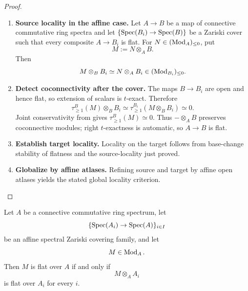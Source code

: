 \begin{proof}
\leavevmode
\begin{enumerate}[label=\textup{(\arabic*)}]
    \item \textbf{Source locality in the affine case.}
    Let \(A\to B\) be a map of connective commutative ring spectra and let
    \(\{\operatorname{Spec}(B_i)\to\operatorname{Spec}(B)\}\) be a Zariski cover such that every
    composite \(A\to B_i\) is flat. For \(N\in(\operatorname{Mod}_{A})_{\leq0}\), put
    \[
        M:=N\otimes_AB.
    \]
    Then
    \[
        M\otimes_BB_i
        \simeq
        N\otimes_AB_i
        \in
        (\operatorname{Mod}_{B_i})_{\leq0}.
    \]

    \item \textbf{Detect coconnectivity after the cover.}
    The maps \(B\to B_i\) are open and hence flat, so extension of scalars is
    \(t\)-exact. Therefore
    \[
        \tau_{\geq1}^{B}(M)\otimes_BB_i
        \simeq
        \tau_{\geq1}^{B_i}(M\otimes_BB_i)
        \simeq0.
    \]
    Joint conservativity from
     gives
    \(\tau_{\geq1}^{B}(M)\simeq0\). Thus \(-\otimes_AB\) preserves
    coconnective modules; right \(t\)-exactness is automatic, so \(A\to B\)
    is flat.

    \item \textbf{Establish target locality.}
    Locality on the target follows from base-change stability of flatness and
    the source-locality just proved.

    \item \textbf{Globalize by affine atlases.}
    Refining source and target by affine open
    atlases yields the stated global locality criterion.
\end{enumerate}
\end{proof}

\begin{proposition}
\label{prop:flat-module-zariski-local}
Let \(A\) be a connective commutative ring spectrum, let
\[
    \{\operatorname{Spec}(A_i)\to\operatorname{Spec}(A)\}_{i\in I}
\]
be an affine spectral Zariski covering family, and let
\[
    M
    \in
    \operatorname{Mod}_A.
\]
Then \(M\) is flat over \(A\) if and only if
\[
    M\otimes_AA_i
\]
is flat over \(A_i\) for every \(i\).
\end{proposition}

